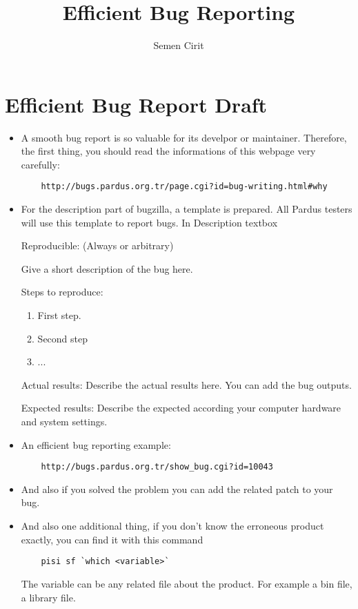 \documentclass[a4paper,10pt]{article}
\title{Efficient Bug Reporting}
\author{Semen Cirit}
\begin{document}
\maketitle

\section{Efficient Bug Report Draft}

\begin{itemize}
  	\item A smooth bug report is so valuable for its develpor or maintainer. Therefore, the first thing, you should read the informations of this webpage very carefully:
	\begin{verbatim} 
 	http://bugs.pardus.org.tr/page.cgi?id=bug-writing.html#why
	\end{verbatim}

  	\item For the description part of bugzilla, a template is prepared. All Pardus testers will use this template to report bugs.
  	In Description textbox

   	Reproducible: (Always or arbitrary)	
   
    	Give a short description of the bug here.
   
   	Steps to reproduce:
   	\begin{enumerate}
    	\item First step.
    	\item Second step
    	\item ...
   	\end{enumerate}

	Actual results:
	Describe the actual results here. You can add the bug outputs.
	
	Expected results:
	Describe the expected according your computer hardware and system settings.
	
	\item An efficient bug reporting example:
	\begin{verbatim}
	http://bugs.pardus.org.tr/show_bug.cgi?id=10043
	\end{verbatim}
	\item And also if you solved the problem you can add the related patch to your bug.

  	\item And also one additional thing, if you don't know the erroneous product exactly, you can find it with this command
	\begin{verbatim}
	pisi sf `which <variable>`
	\end{verbatim}
	The variable can be any related file about the product. For example a bin file, a library file.


\end{itemize}
\end{document}
